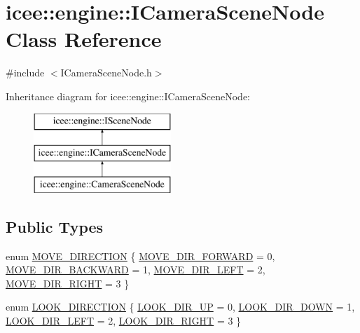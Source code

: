 \hypertarget{classicee_1_1engine_1_1ICameraSceneNode}{
\section{icee::engine::ICameraSceneNode Class Reference}
\label{classicee_1_1engine_1_1ICameraSceneNode}
}


{\ttfamily \#include $<$ICameraSceneNode.h$>$}

Inheritance diagram for icee::engine::ICameraSceneNode:\begin{figure}[H]
\begin{center}
\leavevmode
\includegraphics[height=3.000000cm]{classicee_1_1engine_1_1ICameraSceneNode}
\end{center}
\end{figure}
\subsection*{Public Types}
\begin{DoxyCompactItemize}
\item 
enum \hyperlink{classicee_1_1engine_1_1ICameraSceneNode_a47efe47a91708ebed42249f6304309ae}{MOVE\_\-DIRECTION} \{ \hyperlink{classicee_1_1engine_1_1ICameraSceneNode_a47efe47a91708ebed42249f6304309aea4b03ae2f86d7021eeb3bfb29cae8008a}{MOVE\_\-DIR\_\-FORWARD} =  0, 
\hyperlink{classicee_1_1engine_1_1ICameraSceneNode_a47efe47a91708ebed42249f6304309aead6aeef956bcf2e8416ccc78acd5ec64e}{MOVE\_\-DIR\_\-BACKWARD} =  1, 
\hyperlink{classicee_1_1engine_1_1ICameraSceneNode_a47efe47a91708ebed42249f6304309aea44938439731c5cc9022d17825724c372}{MOVE\_\-DIR\_\-LEFT} =  2, 
\hyperlink{classicee_1_1engine_1_1ICameraSceneNode_a47efe47a91708ebed42249f6304309aea7a1cbc442f614f40bc382413b7070f50}{MOVE\_\-DIR\_\-RIGHT} =  3
 \}
\item 
enum \hyperlink{classicee_1_1engine_1_1ICameraSceneNode_ad7a023986a81f07295135d249c0f00aa}{LOOK\_\-DIRECTION} \{ \hyperlink{classicee_1_1engine_1_1ICameraSceneNode_ad7a023986a81f07295135d249c0f00aaab2871197cec134720ca9207cfce48bf4}{LOOK\_\-DIR\_\-UP} =  0, 
\hyperlink{classicee_1_1engine_1_1ICameraSceneNode_ad7a023986a81f07295135d249c0f00aaa92059eac70f7a3d72ecf26cbe5420ab5}{LOOK\_\-DIR\_\-DOWN} =  1, 
\hyperlink{classicee_1_1engine_1_1ICameraSceneNode_ad7a023986a81f07295135d249c0f00aaacc9a232b8da0c5a96d16d87ab7872d29}{LOOK\_\-DIR\_\-LEFT} =  2, 
\hyperlink{classicee_1_1engine_1_1ICameraSceneNode_ad7a023986a81f07295135d249c0f00aaac6fb21864521bba688ea3565c8ddbf99}{LOOK\_\-DIR\_\-RIGHT} =  3
 \}
\end{DoxyCompactItemize}
